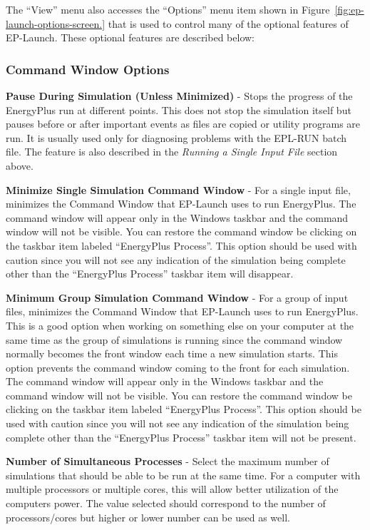The ``View'' menu also accesses the ``Options'' menu item shown in Figure~\ref{fig:ep-launch-options-screen.} that is used to control many of the optional features of EP-Launch. These optional features are described below:

\subsubsection{Command Window Options}\label{command-window-options}

\textbf{Pause During Simulation (Unless Minimized)} - Stops the progress of the EnergyPlus run at different points. This does not stop the simulation itself but pauses before or after important events as files are copied or utility programs are run. It is usually used only for diagnosing problems with the EPL-RUN batch file. The feature is also described in the \emph{Running a Single Input File} section above.

\textbf{Minimize Single Simulation Command Window} - For a single input file, minimizes the Command Window that EP-Launch uses to run EnergyPlus. The command window will appear only in the Windows taskbar and the command window will not be visible. You can restore the command window be clicking on the taskbar item labeled ``EnergyPlus Process''. This option should be used with caution since you will not see any indication of the simulation being complete other than the ``EnergyPlus Process'' taskbar item will disappear.

\textbf{Minimum Group Simulation Command Window} - For a group of input files, minimizes the Command Window that EP-Launch uses to run EnergyPlus. This is a good option when working on something else on your computer at the same time as the group of simulations is running since the command window normally becomes the front window each time a new simulation starts. This option prevents the command window coming to the front for each simulation. The command window will appear only in the Windows taskbar and the command window will not be visible. You can restore the command window be clicking on the taskbar item labeled ``EnergyPlus Process''. This option should be used with caution since you will not see any indication of the simulation being complete other than the ``EnergyPlus Process'' taskbar item will not be present.

\textbf{Number of Simultaneous Processes} - Select the maximum number of simulations that should be able to be run at the same time. For a computer with multiple processors or multiple cores, this will allow better utilization of the computers power. The value selected should correspond to the number of processors/cores but higher or lower number can be used as well.

